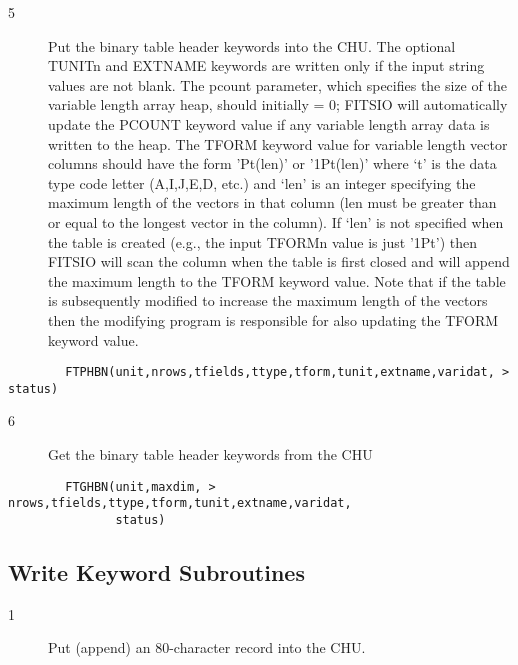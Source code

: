 \documentclass[11pt]{book}
\begin{document}
\begin{description}
\item[5 ]Put the binary table header keywords into the CHU. The optional
   TUNITn and EXTNAME keywords are written only if the input string
   values are not blank.  The pcount parameter, which specifies the
   size of the variable length array heap, should initially = 0;
   FITSIO will automatically update the PCOUNT keyword value if any
   variable length array data is written to the heap.  The TFORM keyword
   value for variable length vector columns should have the form 'Pt(len)'
   or '1Pt(len)' where `t' is the data type code letter (A,I,J,E,D, etc.)
   and  `len' is an integer specifying the maximum length of the vectors
   in that column (len must be greater than or equal to the longest
   vector in the column).  If `len' is not specified when the table is
   created (e.g., the input TFORMn value is just '1Pt') then FITSIO will
   scan the column when the table is first closed and will append the
   maximum length to the TFORM keyword value.  Note that if the table
   is subsequently modified to increase the maximum length of the vectors
   then the modifying program is responsible for also updating the TFORM
  keyword value.
\end{description}


\begin{verbatim}
        FTPHBN(unit,nrows,tfields,ttype,tform,tunit,extname,varidat, > status)
\end{verbatim}

\begin{description}
\item[6 ]Get the binary table header keywords from the CHU
\end{description}

\begin{verbatim}
        FTGHBN(unit,maxdim, > nrows,tfields,ttype,tform,tunit,extname,varidat,
               status)
\end{verbatim}

\subsection{Write Keyword Subroutines \label{FTPREC}}


\begin{description}
\item[1 ]Put (append) an 80-character record into the CHU.
\end{description}
\end{document}

